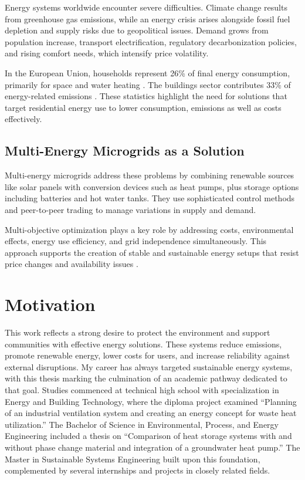 \documentclass[12pt,a4paper]{report}
\begin{document}
Energy systems worldwide encounter severe difficulties. Climate change results from greenhouse gas emissions, while an energy crisis arises alongside fossil fuel depletion and supply risks due to geopolitical issues. Demand grows from population increase, transport electrification, regulatory decarbonization policies, and rising comfort needs, which intensify price volatility.

In the European Union, households represent 26\% of final energy consumption, primarily for space and water heating \cite{eurostat_households2023,odyssee_household}. The buildings sector contributes 33\% of energy-related emissions \cite{eea_buildings}. These statistics highlight the need for solutions that target residential energy use to lower consumption, emissions as well as costs effectively.

\subsection{Multi-Energy Microgrids as a Solution}

Multi-energy microgrids address these problems by combining renewable sources like solar panels with conversion devices such as heat pumps, plus storage options including batteries and hot water tanks. They use sophisticated control methods and peer-to-peer trading to manage variations in supply and demand.

Multi-objective optimization plays a key role by addressing costs, environmental effects, energy use efficiency, and grid independence simultaneously. This approach supports the creation of stable and sustainable energy setups that resist price changes and availability issues \cite{eea_buildings,ipcc_buildings}.

\section{Motivation}
This work reflects a strong desire to protect the environment and support communities with effective energy solutions. These systems reduce emissions, promote renewable energy, lower costs for users, and increase reliability against external disruptions.
My career has always targeted sustainable energy systems, with this thesis marking the culmination of an academic pathway dedicated to that goal. Studies commenced at technical high school with specialization in Energy and Building Technology, where the diploma project examined ``Planning of an industrial ventilation system and creating an energy concept for waste heat utilization.” The Bachelor of Science in Environmental, Process, and Energy Engineering included a thesis on ``Comparison of heat storage systems with and without phase change material and integration of a groundwater heat pump.” The Master in Sustainable Systems Engineering built upon this foundation, complemented by several internships and projects in closely related fields.
\end{document}
